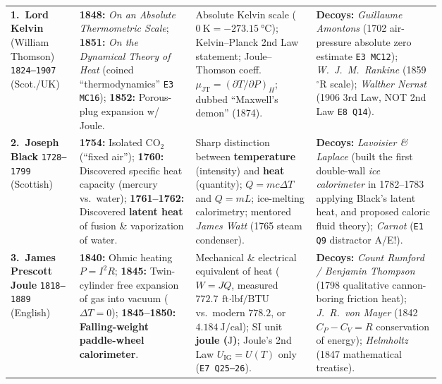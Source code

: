 {\centering
{}\label{tab:23:scientists}
\scriptsize
\setlength{\tabcolsep}{2.5pt}
\renewcommand{\arraystretch}{1.08}
\begin{tabularx}{\linewidth}{@{}L{0.16\linewidth} L{0.27\linewidth} L{0.28\linewidth} X@{}}
\toprule
{} &  &  &  \\
\midrule
\textbf{1.\ Lord Kelvin} (William Thomson) \newline \texttt{1824--1907} (Scot./UK) & \textbf{1848:} \textit{On an Absolute Thermometric Scale}; \textbf{1851:} \textit{On the Dynamical Theory of Heat} (coined ``thermodynamics'' \texttt{E3 MC16}); \textbf{1852:} Porous-plug expansion w/ Joule. & Absolute Kelvin scale ($\SI{0}{\kelvin} = \SI{-273.15}{\celsius}$); Kelvin--Planck 2nd Law statement; Joule--Thomson coeff.\ $\mu_{\mathrm{JT}} = (\partial T/\partial P)_H$; dubbed ``Maxwell's demon'' (1874). & \textbf{Decoys:} \textit{Guillaume Amontons} (1702 air-pressure absolute zero estimate \texttt{E3 MC12}); \textit{W.\ J.\ M.\ Rankine} (1859 $^{\circ}\mathrm{R}$ scale); \textit{Walther Nernst} (1906 3rd Law, NOT 2nd Law \texttt{E8 Q14}). \\
\textbf{2.\ Joseph Black} \newline \texttt{1728--1799} (Scottish) & \textbf{1754:} Isolated $\mathrm{CO_2}$ (``fixed air''); \textbf{1760:} Discovered specific heat capacity (mercury vs.\ water); \textbf{1761--1762:} Discovered \textbf{latent heat} of fusion \& vaporization of water. & Sharp distinction between \textbf{temperature} (intensity) and \textbf{heat} (quantity); $Q = m c \Delta T$ and $Q = m L$; ice-melting calorimetry; mentored \textit{James Watt} (1765 steam condenser). & \textbf{Decoys:} \textit{Lavoisier \& Laplace} (built the first double-wall \textit{ice calorimeter} in 1782--1783 applying Black's latent heat, and proposed caloric fluid theory); \textit{Carnot} (\texttt{E1 Q9} distractor A/E!). \\
\textbf{3.\ James Prescott Joule} \newline \texttt{1818--1889} (English) & \textbf{1840:} Ohmic heating $P = I^2 R$; \textbf{1845:} Twin-cylinder free expansion of gas into vacuum ($\Delta T = 0$); \textbf{1845--1850:} \textbf{Falling-weight paddle-wheel calorimeter}. & Mechanical \& electrical equivalent of heat ($W = J Q$, measured $\SI{772.7}{\text{ft}\cdot\text{lbf/BTU}}$ vs.\ modern $778.2$, or $\SI{4.184}{\joule\per\text{cal}}$); SI unit \textbf{joule ($\si{\joule}$)}; Joule's 2nd Law $U_{\mathrm{IG}} = U(T)$ only (\texttt{E7 Q25--26}). & \textbf{Decoys:} \textit{Count Rumford / Benjamin Thompson} (1798 qualitative cannon-boring friction heat); \textit{J.\ R.\ von Mayer} (1842 $C_P - C_V = R$ conservation of energy); \textit{Helmholtz} (1847 mathematical treatise). \\

\end{tabularx}}
